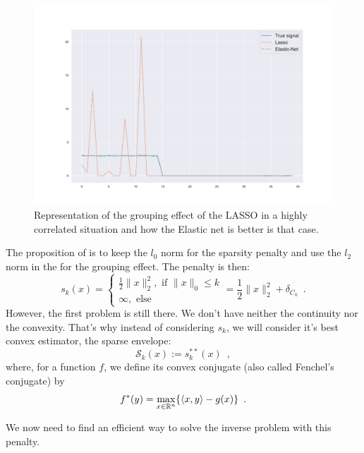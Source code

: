 \documentclass{article}
\begin{document}
\begin{center}
    \begin{figure}[H]
        \centering
        \includegraphics[width=.9\linewidth]{Lasso_enet.pdf}
        \caption{Representation of the grouping effect of the LASSO in a highly correlated situation and how the Elastic net is better is that case.}
        \label{fig:lasso_enet}
    \end{figure}
\end{center}



The proposition of \cite{beck} is to keep the $l_0$ norm for the sparsity penalty and use the $l_2$ norm in the \enet for the grouping effect. The penalty is then:
\[s_k(x)=\begin{cases} \frac{1}{2}\|x\|_2^2, \text{ if } \|x\|_0\leq k\\
\infty, \text{ else}\end{cases} = \frac{1}{2}\|x\|_2^2 + \delta_{C_k}\enspace.\]
However, the first problem is still there. We don't have neither the continuity nor the convexity. That's why instead of considering $s_k$, we will consider it's best convex estimator, the sparse envelope:
\[ \mathcal{S}_k(x) := s_k^{**}(x)\enspace,\]
where, for a function $f$, we define its convex conjugate (also called Fenchel's conjugate) by  
\begin{equation}\label{eq:conjugate}
    f^*(y)=\max_{x\in\mathbb{R}^n}\{\langle x, y\rangle - g(x)\}\enspace.
\end{equation}

We now need to find an efficient way to solve the inverse problem with this penalty.

\end{document}

